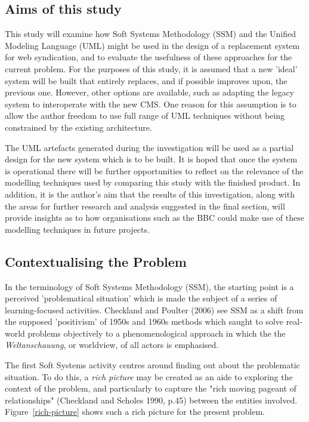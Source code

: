 \documentclass{article}
\begin{document}
\subsection{Aims of this study}

This study will examine how Soft Systems Methodology (SSM) and the Unified Modeling Language (UML) might be used in the design of a replacement system for web syndication, and to evaluate the usefulness of these approaches for the current problem. For the purposes of this study, it is assumed that a new 'ideal' system will be built that entirely replaces, and if possible improves upon, the previous one. However, other options are available, such as adapting the legacy system to interoperate with the new CMS. One reason for this assumption is to allow the author freedom to use full range of UML techniques without being constrained by the existing architecture.

The UML artefacts generated during the investigation will be used as a partial design for the new system which is to be built. It is hoped that once the system is operational there will be further opportunities to reflect on the relevance of the modelling techniques used by comparing this study with the finished product. In addition, it is the author's aim that the results of this investigation, along with the areas for further research and analysis suggested in the final section, will provide insights as to how organisations such as the BBC could make use of these modelling techniques in future projects.

\subsection{Contextualising the Problem}

In the terminology of Soft Systems Methodology (SSM), the starting point is a perceived 'problematical situation' which is made the subject of a series of learning-focused activities. Checkland and Poulter (2006) see SSM as a shift from the supposed 'positivism' of 1950s and 1960s methods which saught to solve real-world problems objectively to a phenomenological approach in which the the \textit{Weltanschauung}, or worldview, of all actors is emphasised.

The first Soft Systems activity centres around finding out about the problematic situation. To do this, a \textit{rich picture} may be created as an aide to exploring the context of the problem, and particularly to capture the "rich moving pageant of relationships" (Checkland and Scholes 1990, p.45) between the entities involved. Figure~\ref{rich-picture} shows such a rich picture for the present problem. 
\end{document}
